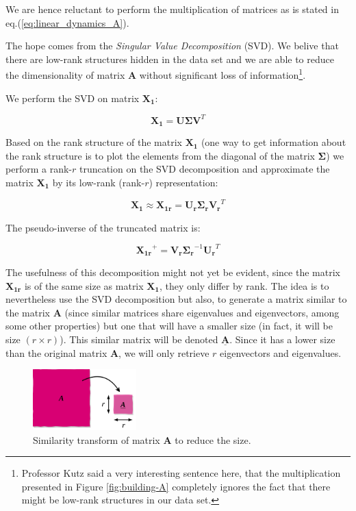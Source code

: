 \documentclass[10pt,twocolumn]{article}
\begin{document}
We are hence reluctant to perform the multiplication of matrices as is stated in eq.(\ref{eq:linear_dynamics_A}). 

The hope comes from the \textit{Singular Value Decomposition} (SVD). We belive that there are low-rank structures hidden in the data set and we are able to reduce the dimensionality of matrix $\bm{A}$ without significant loss of information\footnote{Professor Kutz said a very interesting sentence here, that the multiplication presented in Figure \ref{fig:building-A} completely ignores the fact that there might be low-rank structures in our data set.}.

We perform the SVD on matrix $\bm{X_1}$:

\begin{equation} \label{eq:solution}
\bm{X_1} = \bm{U} \bm{\Sigma} \bm{V}^T 
\end{equation}

Based on the rank structure of the matrix $\bm{X_1}$ (one way to get information about the rank structure is to plot the elements from the diagonal of the matrix $\bm{\Sigma}$) we perform a rank-$r$ truncation on the SVD decomposition and approximate the matrix $\bm{X_1}$ by its low-rank (rank-$r$) representation:

\begin{equation} \label{eq:solution-approx}
\bm{X_1} \approx \bm{X_{1r}} = \bm{U_r} \bm{\Sigma_r} \bm{V_r}^T 
\end{equation}

The pseudo-inverse of the truncated matrix is:

\begin{equation} \label{eq:pseudo-inverse}
\bm{X_{1r}}^{+} = \bm{V_r}  \bm{\Sigma_r}^{-1} \bm{U_r}^T
\end{equation}

The usefulness of this decomposition might not yet be evident, since the matrix $\bm{X_{1r}}$ is of the same size as matrix $\bm{X_{1}}$, they only differ by rank. The idea is to nevertheless use the SVD decomposition but also, to generate a matrix similar to the matrix $\bm{A}$ (since similar matrices share eigenvalues and eigenvectors, among some other properties) but one that will have a smaller size (in fact, it will be size $(r \times r)$). This similar matrix will be denoted $\underline{\bm{A}}$. Since it has a lower size than the original matrix $\bm{A}$, we will only retrieve $r$ eigenvectors and eigenvalues.

\begin{figure}
\centering\includegraphics[width=4cm]{similar-matrices.png}
\caption{Similarity transform of matrix $\bm{A}$ to reduce the size.}
\label{fig:similar-matrices}
\end{figure}
\end{document}
